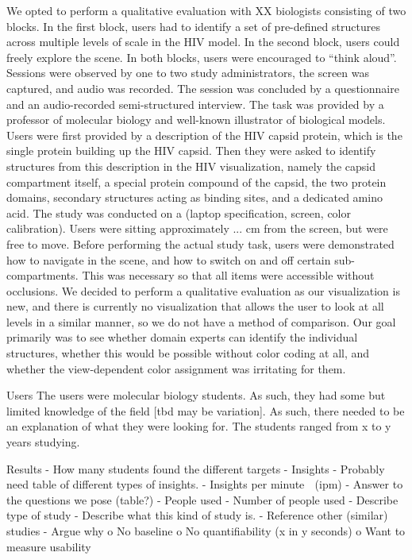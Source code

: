 \documentclass[review,journal]{vgtc}         %
\begin{document}
We opted to perform a qualitative evaluation with XX biologists consisting of two blocks.
In the first block, users had to identify a set of pre-defined structures across multiple levels of scale in the HIV model. 
In the second block, users could freely explore the scene.
In both blocks, users were encouraged to “think aloud”. 
Sessions were observed by one to two study administrators, the screen was captured, and audio was recorded. 
The session was concluded by a questionnaire and an audio-recorded semi-structured interview. 
The task was provided by a professor of molecular biology and well-known illustrator of biological models. 
Users were first provided by a description of the HIV capsid protein, which is the single protein building up the HIV capsid.
Then they were asked to identify structures from this description in the HIV visualization, namely the capsid compartment itself, a special protein compound of the capsid, the two protein domains, secondary structures acting as binding sites, and a dedicated amino acid. 
The study was conducted on a (laptop specification, screen, color calibration). 
Users were sitting approximately ... cm from the screen, but were free to move. 
Before performing the actual study task, users were demonstrated how to navigate in the scene, and how to switch on and off certain sub-compartments. 
This was necessary so that all items were accessible without occlusions. 
We decided to perform a qualitative evaluation as our visualization is new, and there is currently no visualization that allows the user to look at all levels in a similar manner, so we do not have a method of comparison.
Our goal primarily was to see whether domain experts can identify the individual structures, whether this would be possible without color coding at all, and whether the view-dependent color assignment was irritating for them. 

Users
The users were molecular biology students. As such, they had some but limited knowledge of the field [tbd may be variation]. 
As such, there needed to be an explanation of what they were looking for. The students ranged from x to y years studying.

Results
-	How many students found the different targets
-	Insights
-	Probably need table of different types of insights.
-	Insights per minute  (ipm)
-	Answer to the questions we pose (table?)
-	People used
-	Number of people used
-	Describe type of study
-	Describe what this kind of study is.
-	Reference other (similar) studies
-	Argue why 
o	No baseline
o	No quantifiability (x in y seconds)
o	Want to measure usability
\end{document}
